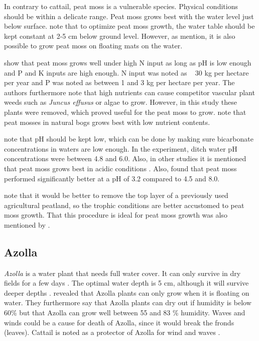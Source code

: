 {%
In contrary to cattail, peat moss is a vulnerable species. Physical conditions should be within a delicate range. Peat moss grows best with the water level just below surface.  \citet{fritz2014paludicultuur} note that to optimize peat moss growth, the water table should be kept constant at 2-5 cm below ground level. However, as \citet{gaudig2014sphagnum} mention, it is also possible to grow peat moss on floating mats on the water.

\citet{Temmink2017196} show that peat moss grows well under high N input as long as pH is low enough and P and K inputs are high enough. 
N input was noted as ~ 30 kg per hectare per year and P was noted as between 1 and 3 kg per hectare per year.  The authors furthermore note that high nutrients can cause competitor vascular plant weeds such as \textit{Juncus effusus} or algae to grow. However, in this study these plants were removed, which proved useful for the peat moss to grow. \citep{wichtmann2016paludiculture} note that peat mosses in natural bogs grows best with low nutrient contents.

\citet{Temmink2017196} note that pH should be kept low, which can be done by making sure bicarbonate concentrations in waters are low enough. In the experiment, ditch water pH concentrations were between 4.8 and 6.0. Also, in other studies it is mentioned that peat moss grows best in acidic conditions \citep{wichtmann2016paludiculture}. Also, \citet{gaudig2005growing} found that peat moss performed significantly better at a pH of 3.2 compared to 4.5 and 8.0. 

\citet{fritz2014paludicultuur} note that it would be better to remove the top layer of a previously used agricultural peatland, so the trophic conditions are better accustomed to peat moss growth. That this procedure is ideal for peat moss growth was also mentioned by \citet{Temmink2017196}.

\subsection{Azolla}

\textit{Azolla} is a water plant that needs full water cover. It can only survive in dry fields for a few days \citep{wagner1997azolla}. The optimal water depth is 5 cm, although it will survive deeper depths \citep{wagner1997azolla}. \citet{sabetraftar2013review} revealed that Azolla plants can only grow when it is floating on water. They furthermore say that Azolla plants can dry out if humidity is below 60\% but that Azolla can grow well between 55 and 83 \% humidity.  Waves and winds could be a cause for death of Azolla, since it would break the fronds (leaves). Cattail is noted as a protector of Azolla for wind and waves \citep{sabetraftar2013review}.  

}
